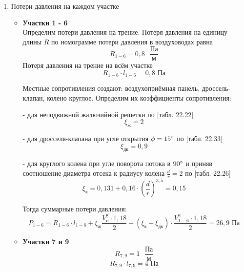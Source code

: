 \begin{enumerate}
    \item   Потери давления на каждом участке
        \begin{itemize}
            \item   \textbf{Участки 1 - 6} \\
                    Определим потери давления на трение. Потеря давления на единицу длины $R$ по
                    номограмме потери давления в воздуховодах равна
                    $$
                        R_{1-6} = 0,8 \text{ }\frac{\text{Па}}{\text{м}}
                    $$
                    Потеря давления на трение на всём участке
                    $$
                        R_{1-6} \cdot l_{1-6} = 0,8 \text{ Па}
                    $$

                    Местные сопротивления создают: воздухоприёмная панель, дроссель-клапан, колено круглое.
                    Определим их коэффициенты сопротивления:

                    - для неподвижной жалюзийной решетки по
                    \cite{air_ventilation_and_conditioning}[табл. 22.22]
                    $$
                        \xi_\text{ж} = 2
                    $$

                    - для дросселя-клапана при угле открытия $\phi = 15 \degree$ по
                    \cite{air_ventilation_and_conditioning}[табл. 22.33]
                    $$
                        \xi_\text{дк} = 0,9
                    $$

                    - для круглого колена при угле поворота потока в $90 \degree$ и приняв соотношение диаметра отсека к радиусу колена $\frac{d}{r} = 2$ по
                    \cite{air_ventilation_and_conditioning}[табл. 22.26]
                    $$
                        \xi_\text{к} = 0,131 + 0,16 \cdot \left( \frac{d}{r} \right)^{3,5} = 0,15
                    $$

                    Тогда суммарные потери давления:
                    $$
                        P_{1-6} = R_{1-6} \cdot l_{1-6} + \xi_\text{ж} \frac{V_\text{п}^2 \cdot 1,18}{2}
                                    + (\xi_\text{к} + \xi_\text{дк}) \cdot \frac{V_{1-6}^2 \cdot 1,18}{2}
                                = 26,9 \text{ Па}
                    $$

            \item   \textbf{Участки 7 и 9} \\
                    $$
                        R_{7,9} = 1 \text{ }\frac{\text{Па}}{\text{м}}
                    $$
                    $$
                        R_{7,9} \cdot l_{7,9} = 4 \text{ Па}
                    $$


\end{itemize}
\end{enumerate}
